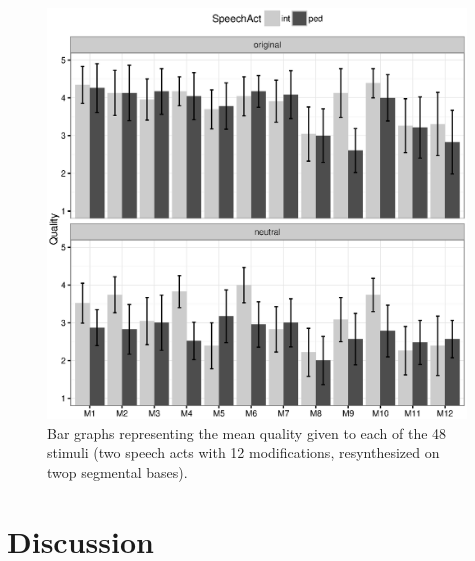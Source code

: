 \documentclass[output=paper]{LSP/langsci}
\begin{document}
\begin{figure}

\includegraphics[width=0.99\textwidth]{figures/MOR16.eps}
\caption{Bar graphs representing the mean quality given to each of the 48 stimuli (two speech acts with 12 modifications, resynthesized on twop segmental bases).}
\label{figure:Quality}
\end{figure}


\section{Discussion}\label{discussion}\largerpage
\end{document}
